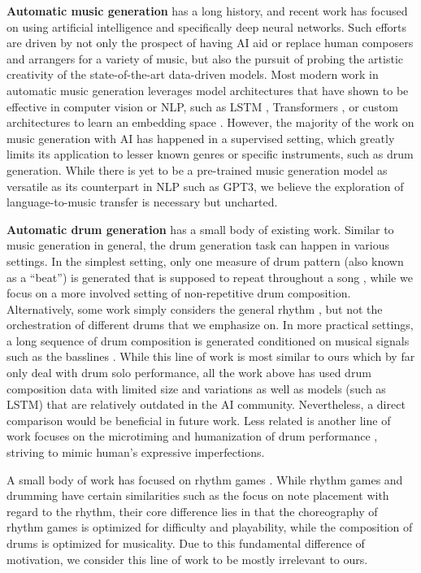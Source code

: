 \documentclass[letterpaper]{article} %
\begin{document}
\textbf{Automatic music generation} has a long history, and recent work has focused on using artificial intelligence \cite{kaliakatsos2020artificial} and specifically deep neural networks. Such efforts are driven by not only the prospect of having AI aid or replace human composers and arrangers for a variety of music, but also the pursuit of probing the artistic creativity of the state-of-the-art data-driven models. Most modern work in automatic music generation leverages model architectures that have shown to be effective in computer vision or NLP, such as LSTM \cite{lyu2015modelling}, Transformers \citep{huang2018music,zeng2021musicbert,https://doi.org/10.48550/arxiv.2210.10349}, or custom architectures to learn an embedding space \cite{liang2020pirhdy}. However, the majority of the work on music generation with AI has happened in a supervised setting, which greatly limits its application to lesser known genres or specific instruments, such as drum generation. While there is yet to be a pre-trained music generation model as versatile as its counterpart in NLP such as GPT3, we believe the exploration of language-to-music transfer is necessary but uncharted.

\textbf{Automatic drum generation} has a small body of existing work. Similar to music generation in general, the drum generation task can happen in various settings. In the simplest setting, only one measure of drum pattern (also known as a ``beat'') is generated that is supposed to repeat throughout a song  \cite{vogl2017intelligent,bruford2020jaki,complexis21}, while we focus on a more involved setting of non-repetitive drum composition. Alternatively, some work simply considers the general rhythm \cite{lattner2019high}, but not the orchestration of different drums that we emphasize on. In more practical settings, a long sequence of drum composition is generated conditioned on musical signals such as the basslines \cite{makris2017combining,makris2019conditional}. While this line of work is most similar to ours which by far only deal with drum solo performance, all the work above has used drum composition data with limited size and variations as well as models (such as LSTM) that are relatively outdated in the AI community. Nevertheless, a direct comparison would be beneficial in future work. Less related is another line of work focuses on the microtiming and humanization of drum performance \cite{gillick2019learning,burloiu2020adaptive,burloiu2020interactive}, striving to mimic human's expressive imperfections.

A small body of work has focused on rhythm games \cite{donahue2017dance,liang2019procedural}. While rhythm games and drumming have certain similarities such as the focus on note placement with regard to the rhythm, their core difference lies in that the choreography of rhythm games is optimized for difficulty and playability, while the composition of drums is optimized for musicality. Due to this fundamental difference of motivation, we consider this line of work to be mostly irrelevant to ours.
\end{document}
